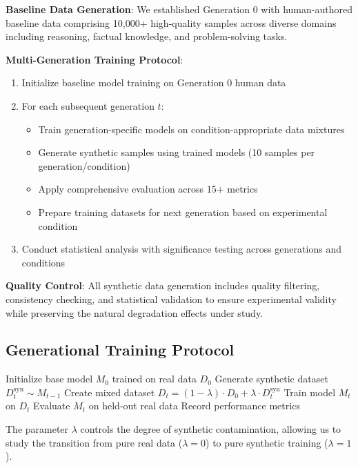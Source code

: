 \documentclass{article}
\begin{document}
\textbf{Baseline Data Generation}: We established Generation 0 with human-authored baseline data comprising 10,000+ high-quality samples across diverse domains including reasoning, factual knowledge, and problem-solving tasks.

\textbf{Multi-Generation Training Protocol}:
\begin{enumerate}
\item Initialize baseline model training on Generation 0 human data
\item For each subsequent generation $t$:
  \begin{itemize}
  \item Train generation-specific models on condition-appropriate data mixtures
  \item Generate synthetic samples using trained models (10 samples per generation/condition)
  \item Apply comprehensive evaluation across 15+ metrics
  \item Prepare training datasets for next generation based on experimental condition
  \end{itemize}
\item Conduct statistical analysis with significance testing across generations and conditions
\end{enumerate}

\textbf{Quality Control}: All synthetic data generation includes quality filtering, consistency checking, and statistical validation to ensure experimental validity while preserving the natural degradation effects under study.

\subsection{Generational Training Protocol}

\begin{algorithm}
\caption{Digital Inbreeding Simulation}
\begin{algorithmic}[1]
\STATE Initialize base model $M_0$ trained on real data $D_0$
    \STATE Generate synthetic dataset $D_t^{\text{syn}} \sim M_{t-1}$
    \STATE Create mixed dataset $D_t = (1-\lambda) \cdot D_0 + \lambda \cdot D_t^{\text{syn}}$
    \STATE Train model $M_t$ on $D_t$
    \STATE Evaluate $M_t$ on held-out real data
    \STATE Record performance metrics
\ENDFOR
\end{algorithmic}
\end{algorithm}

The parameter $\lambda$ controls the degree of synthetic contamination, allowing us to study the transition from pure real data ($\lambda = 0$) to pure synthetic training ($\lambda = 1$).
\end{document}
